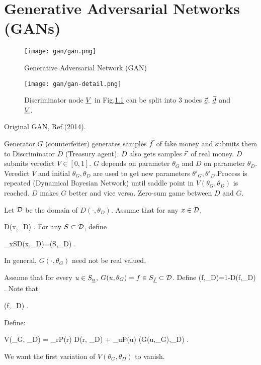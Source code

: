 \chapter{Generative Adversarial Networks
 (GANs)}

\begin{figure}[h!]
\centering
\texttt{[image: gan/gan.png]}
\caption{Generative Adversarial  Network (GAN)} 
\label{fig-gan}
\end{figure}

\begin{figure}[h!]
\centering
\texttt{[image: gan/gan-detail.png]}
\caption{Discriminator node $\underline{V}$ in Fig.\ref{fig-gan} can be
split into 3 nodes $\vec{{\underline{c}}}$, $\vec{{\underline{d}}}$ and $\underline{V}$.} 
\label{fig-gan-detail}
\end{figure}

Original GAN, 
Ref.\cite{gf2014}(2014). 

Generator $G$ (counterfeiter) generates samples ${\vec{f}}$ of fake money and submits them to Discriminator $D$ (Treasury agent). $D$ also gets samples ${\vec{r}}$ of real money. $D$ submits veredict $V\in [0,1]$. $G$ depends on parameter $\theta_G$ and $D$ on parameter $\theta_D$. Veredict $V$ and initial $\theta_G, \theta_D$ are used to get new parameters $\theta'_G, \theta'_D$.Process is repeated (Dynamical Bayesian Network) until saddle point in $V(\theta_G, \theta_D)$ is reached. $D$ makes $G$ better and vice versa.  Zero-sum game between $D$ and $G$.



Let ${\cal D}$ be the domain of $D(\cdot, \theta_D)$. Assume that for any $x\in {\cal D}$,

\leq D(x,\theta_D)
\;.
\eeq
For any $S\subset{\cal D}$, define

\beq
\sum_{x\in S}D(x,\theta_D)=\lam(S,\theta_D)
\;.
\eeq


 In general, 
$G(\cdot,\theta_G)$ need not be real valued. 

Assume that for every $u\in S_{\underline{u}}$,
 $G(u,\theta_G)=f\in S_{\underline{f}}\subset {\cal D}$. Define
\beq
{}(f,\theta_D)=1-D(f,\theta_D)
\;.
\eeq
Note that

\leq{}(f,\theta_D)
\;.
\eeq

Define:

\beq
V(\theta_G, \theta_D) =
\sum_{r}P(r)
\ln D(r, \theta_D)
+ \sum_{u}P(u)\ln
{}(G(u,\theta_G),\theta_D)
\;.	
\eeq

We want the first variation of $V(\theta_G, \theta_D)$ to vanish.




